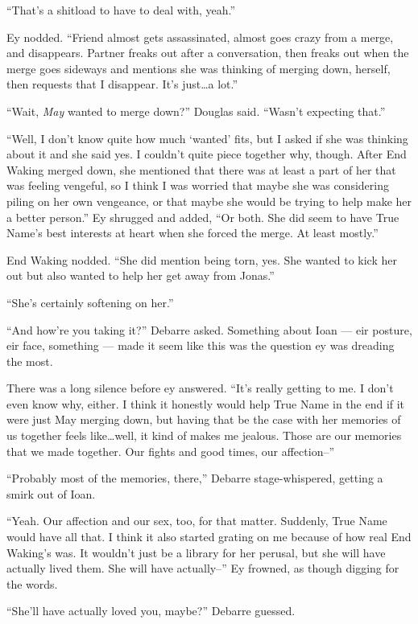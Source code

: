 ``That's a shitload to have to deal with, yeah.''

Ey nodded. ``Friend almost gets assassinated, almost goes crazy from a merge, and disappears. Partner freaks out after a conversation, then freaks out when the merge goes sideways and mentions she was thinking of merging down, herself, then requests that I disappear. It's just\ldots a lot.''

``Wait, \emph{May} wanted to merge down?'' Douglas said. ``Wasn't expecting that.''

``Well, I don't know quite how much `wanted' fits, but I asked if she was thinking about it and she said yes. I couldn't quite piece together why, though. After End Waking merged down, she mentioned that there was at least a part of her that was feeling vengeful, so I think I was worried that maybe she was considering piling on her own vengeance, or that maybe she would be trying to help make her a better person.'' Ey shrugged and added, ``Or both. She did seem to have True Name's best interests at heart when she forced the merge. At least mostly.''

End Waking nodded. ``She did mention being torn, yes. She wanted to kick her out but also wanted to help her get away from Jonas.''

``She's certainly softening on her.''

``And how're you taking it?'' Debarre asked. Something about Ioan — eir posture, eir face, something — made it seem like this was the question ey was dreading the most.

There was a long silence before ey answered. ``It's really getting to me. I don't even know why, either. I think it honestly would help True Name in the end if it were just May merging down, but having that be the case with her memories of us together feels like\ldots well, it kind of makes me jealous. Those are our memories that we made together. Our fights and good times, our affection--''

``Probably most of the memories, there,'' Debarre stage-whispered, getting a smirk out of Ioan.

``Yeah. Our affection and our sex, too, for that matter. Suddenly, True Name would have all that. I think it also started grating on me because of how real End Waking's was. It wouldn't just be a library for her perusal, but she will have actually lived them. She will have actually--'' Ey frowned, as though digging for the words.

``She'll have actually loved you, maybe?'' Debarre guessed.

